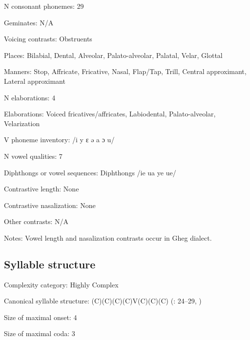 {\begin{appendixdesc}
\item[N consonant phonemes:] 29

\item[Geminates:] N/A

\item[Voicing contrasts:] Obstruents

\item[Places:] Bilabial, Dental, Alveolar, Palato-alveolar, Palatal, Velar, Glottal

\item[Manners:] Stop, Affricate, Fricative, Nasal, Flap/Tap, Trill, Central approximant, Lateral approximant

\item[N elaborations:] 4

\item[Elaborations:] Voiced fricatives/affricates, Labiodental, Palato-alveolar, Velarization

\item[V phoneme inventory:] /i y ɛ ə a ɔ u/

\item[N vowel qualities:] 7

\item[Diphthongs or vowel sequences:] Diphthongs /ie ua ye ue/

\item[Contrastive length:] None

\item[Contrastive nasalization:] None

\item[Other contrasts:] N/A

\item[Notes:] Vowel length and nasalization contrasts occur in Gheg dialect.
\end{appendixdesc}
\subsection*{Syllable structure}
\begin{appendixdesc}

\item[Complexity category:] Highly Complex

\item[Canonical syllable structure:] (C)(C)(C)(C)V(C)(C)(C) (\citealt{Newmark1957}: 24--29, \citealt{Klippenstein2010})

\item[Size of maximal onset:] 4

\item[Size of maximal coda:] 3


\end{appendixdesc}}
